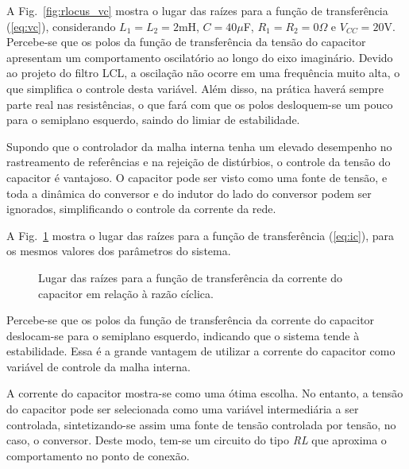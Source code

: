   A Fig.~\ref{fig:rlocus_vc} mostra o lugar das raízes para a função de transferência (\ref{eq:vc}), considerando $L_1=L_2=2$mH, $C=40\mu$F, $R_1=R_2=0\Omega$ e $V_{CC}=20$V. Percebe-se que os polos da função de transferência da tensão do capacitor apresentam um comportamento oscilatório ao longo do eixo imaginário. Devido ao projeto do filtro LCL, a oscilação não ocorre em uma frequência muito alta, o que simplifica o controle desta variável. Além disso, na prática haverá sempre parte real nas resistências, o que fará com que os polos desloquem-se um pouco para o semiplano esquerdo, saindo do limiar de estabilidade.

  Supondo que o controlador da malha interna tenha um elevado desempenho no rastreamento de referências e na rejeição de distúrbios, o controle da tensão do capacitor é vantajoso. O capacitor pode ser visto como uma fonte de tensão, e toda a dinâmica do conversor e do indutor do lado do conversor podem ser ignorados, simplificando o controle da corrente da rede.

  A Fig.~\ref{fig:rlocus_ic} mostra o lugar das raízes para a função de transferência (\ref{eq:ic}), para os mesmos valores dos parâmetros do sistema.

  \begin{figure}[htb]
    \centering{
      }
    \renewcommand\figurename{Fig.}
    \caption{Lugar das raízes para a função de transferência da corrente do capacitor em relação à razão cíclica.}
    \label{fig:rlocus_ic}
  \end{figure}

  Percebe-se que os polos da função de transferência da corrente do capacitor deslocam-se para o semiplano esquerdo, indicando que o sistema tende à estabilidade. Essa é a grande vantagem de utilizar a corrente do capacitor como variável de controle da malha interna.

  A corrente do capacitor mostra-se como uma ótima escolha. No entanto, a tensão do capacitor pode ser selecionada como uma variável intermediária a ser controlada, sintetizando-se assim uma fonte de tensão controlada por tensão, no caso, o conversor. Deste modo, tem-se um circuito do tipo \emph{RL} que aproxima o comportamento no ponto de conexão.



